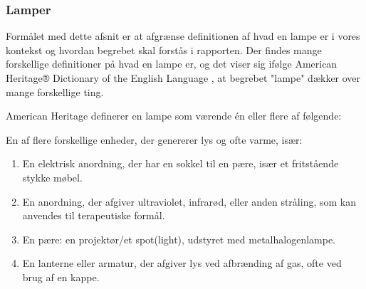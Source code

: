 



\subsubsection{Lamper}
Formålet med dette afsnit er at afgrænse definitionen af hvad en lampe er i vores kontekst og hvordan begrebet skal forstås i rapporten.
Der findes mange forskellige definitioner på hvad en lampe er, og det viser sig ifølge American Heritage® Dictionary of the English Language \cite{american_heritage}, at begrebet "lampe" dækker over mange forskellige ting. 

American Heritage definerer en lampe som værende én eller flere af følgende:

En af flere forskellige enheder, der genererer lys og ofte varme, især:
\begin{enumerate}
    \item En elektrisk anordning, der har en sokkel til en pære, især et fritstående stykke møbel.
    \item En anordning, der afgiver ultraviolet, infrarød, eller anden stråling, som kan anvendes til terapeutiske formål.
    \item En pære: en projektør/et spot(light), udstyret med metalhalogenlampe.
    \item En lanterne eller armatur, der afgiver lys ved afbrænding af gas, ofte ved brug af en kappe.
\end{enumerate}

